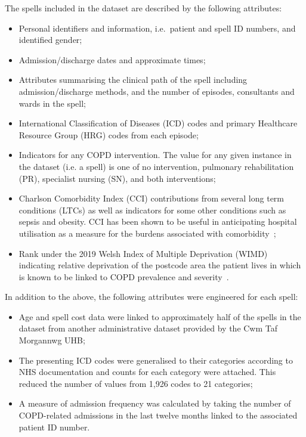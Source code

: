 \documentclass[11pt]{article}
\begin{document}
The spells included in the dataset are described by the following attributes:
\begin{itemize}
    \item Personal identifiers and information, i.e.\ patient and spell ID
        numbers, and identified gender;
    \item Admission/discharge dates and approximate times;
    \item Attributes summarising the clinical path of the spell including
        admission/discharge methods, and the number of episodes, consultants and
        wards in the spell;
    \item International Classification of Diseases (ICD) codes and primary
        Healthcare Resource Group (HRG) codes from each episode;
    \item Indicators for any COPD intervention. The value for any given instance
        in the dataset (i.e. a spell) is one of no intervention, pulmonary
        rehabilitation (PR), specialist nursing (SN), and both interventions;
    \item Charlson Comorbidity Index (CCI) contributions from several long term
        conditions (LTCs) as well as indicators for some other conditions such
        as sepsis and obesity. CCI has been shown to be useful in anticipating
        hospital utilisation as a measure for the burdens associated with
        comorbidity~\cite{Simon2011};
    \item Rank under the 2019 Welsh Index of Multiple Deprivation (WIMD)
        indicating relative deprivation of the postcode area the patient lives
        in which is known to be linked to COPD prevalence and
        severity~\cite{Collins2018,Sexton2016,Steiner2017}.
\end{itemize}

In addition to the above, the following attributes were engineered for each
spell:
\begin{itemize}
    \item Age and spell cost data were linked to approximately half of the
        spells in the dataset from another administrative dataset provided by
        the Cwm Taf Morgannwg UHB;
    \item The presenting ICD codes were generalised to their categories
        according to NHS documentation and counts for each category were
        attached. This reduced the number of values from
        1,926 codes to 21 categories;
    \item A measure of admission frequency was calculated by taking the number
        of COPD-related admissions in the last twelve months linked to the
        associated patient ID number.
\end{itemize}
\end{document}
